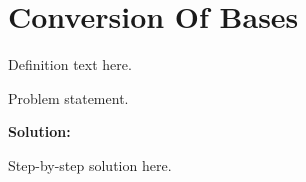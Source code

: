 \section{Conversion Of Bases}


\begin{definition}[Term]
Definition text here.
\end{definition}

\begin{example}
Problem statement.

\textbf{Solution:}

Step-by-step solution here.
\end{example}
